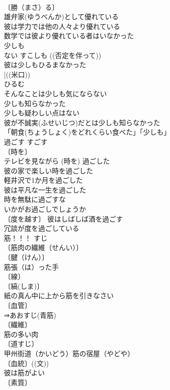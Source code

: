 \documentclass[8pt]{extreport}
\begin{document}
\begin{CJK}{UTF8}{min}
\\	〔勝（まさ）る〕
\\	雄弁家(ゆうべんか)として優れている 
\\	彼は学力では他の人々より優れている 
\\	数学では彼より優れている者はいなかった 
\\	少しも　
\\	ない	すこしも	((否定を伴って))
\\	彼は少しもひるまなかった 
\\	[((米口)) 
\\	ひるむ　
\\	そんなことは少しも気にならない 
\\	少しも知らなかった 
\\	少しも疑わしい点はない 
\\	彼が不誠実(ふせいじつ)だとは少しも知らなかった 
\\	「朝食(ちょうしょく)をどれくらい食べた」「少しも」 
\\	過ごす	すごす	
\\	〔時を〕
\\	テレビを見ながら (時を) 過ごした 
\\	彼の家で楽しい時を過ごした 
\\	軽井沢で1か月を過ごした 
\\	彼は平凡な一生を過ごした 
\\	時を無駄に過ごすな 
\\	いかがお過ごしでしょうか 
\\	〔度を越す〕 彼はしばしば酒を過ごす 
\\	冗談が度を過ごしている 
\\	筋！！！	すじ	
\\	〔筋肉の繊維（せんい）〕
\\	〔腱（けん）〕
\\	筋張（は）った手 
\\	〔線〕
\\	〔縞(しま)〕
\\	紙の真ん中に上から筋を引きなさい 
\\	〔血管〕
\\	⇒あおすじ(青筋) 
\\	〔繊維〕
\\	筋の多い肉 
\\	〔道すじ〕　
\\	甲州街道（かいどう）筋の宿屋（やどや） 
\\	〔血統〕((文)) 
\\	彼は筋がよい 
\\	〔素質〕

\end{CJK}
\end{document}
